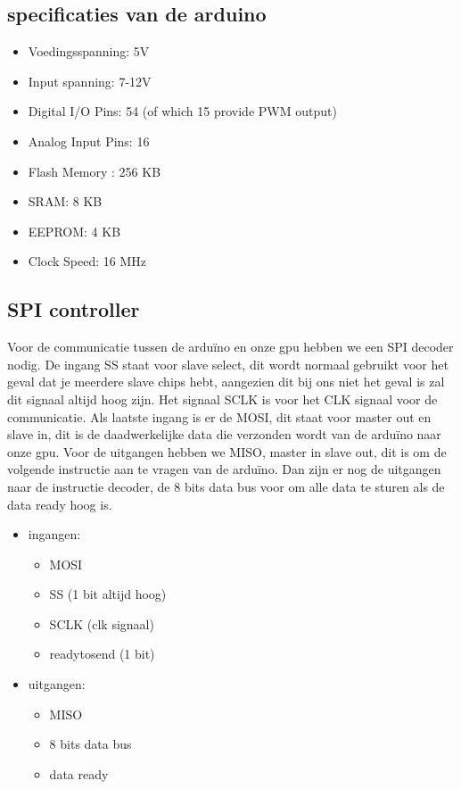 \documentclass{scrartcl}
\begin{document}
\subsection {specificaties van de arduino}
\begin {itemize}
\item Voedingsspanning:	 5V
\item Input spanning: 	7-12V
\item Digital I/O Pins: 	54 (of which 15 provide PWM output)
\item Analog Input Pins:	16
\item Flash Memory	:	256 KB 
\item SRAM:			8 KB
\item EEPROM:		4 KB
\item Clock Speed:		16 MHz
\end {itemize}

\subsection { SPI controller}

Voor de communicatie tussen de arduïno en onze gpu hebben we een SPI decoder nodig. De ingang SS staat voor slave select, dit wordt normaal gebruikt voor het geval dat je meerdere slave chips hebt, aangezien dit bij ons niet het geval is zal dit signaal altijd hoog zijn. Het signaal SCLK is voor het CLK signaal voor de communicatie. Als laatste ingang is er de MOSI, dit staat voor master out en slave in, dit is de daadwerkelijke data die verzonden wordt van de arduïno naar onze gpu. Voor de uitgangen hebben we MISO, master in slave out, dit is om de volgende instructie aan te vragen van de arduïno. Dan zijn er nog de uitgangen naar de instructie decoder, de 8 bits data bus voor om alle data te sturen als de data ready hoog is.

\begin {itemize}
\item ingangen:
\begin {itemize}
\item MOSI 
\item SS (1 bit altijd hoog)
\item SCLK (clk signaal)
\item readytosend (1 bit)
\end {itemize}
\item uitgangen:
\begin {itemize}
\item MISO
\item 8 bits data bus
\item data ready
\end {itemize}
\end {itemize}
\end{document}
